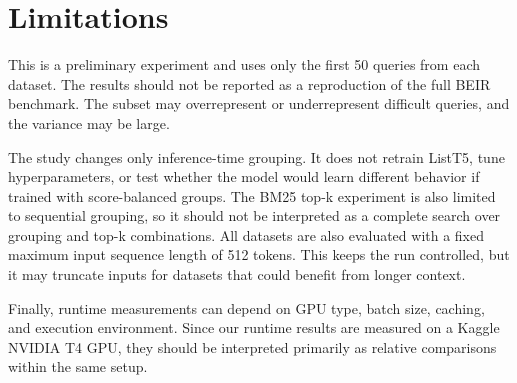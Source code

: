 \section*{Limitations}

This is a preliminary experiment and uses only the first 50 queries from each dataset.
The results should not be reported as a reproduction of the full BEIR benchmark.
The subset may overrepresent or underrepresent difficult queries, and the variance may be large.

The study changes only inference-time grouping.
It does not retrain ListT5, tune hyperparameters, or test whether the model would learn different behavior if trained with score-balanced groups.
The BM25 top-k experiment is also limited to sequential grouping, so it should not be interpreted as a complete search over grouping and top-k combinations.
All datasets are also evaluated with a fixed maximum input sequence length of 512 tokens.
This keeps the run controlled, but it may truncate inputs for datasets that could benefit from longer context.

Finally, runtime measurements can depend on GPU type, batch size, caching, and execution environment. Since our runtime results are measured on a Kaggle NVIDIA T4 GPU, they should be interpreted primarily as relative comparisons within the same setup.

